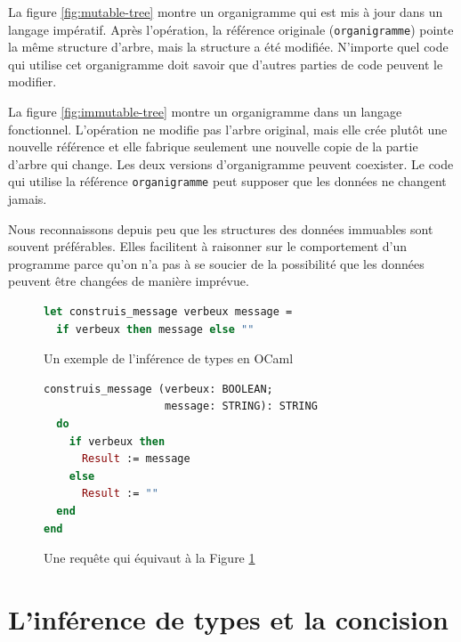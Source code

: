 \documentclass[french]{report}
\begin{document}
La figure \ref{fig:mutable-tree} montre un organigramme qui est mis à jour dans un langage impératif. Après l'opération, la référence originale (\texttt{organigramme}) pointe la même structure d'arbre, mais la structure a été modifiée. N'importe quel code qui utilise cet organigramme doit savoir que d'autres parties de code peuvent le modifier.

La figure \ref{fig:immutable-tree} montre un organigramme dans un langage fonctionnel. L'opération ne modifie pas l'arbre original, mais elle crée plutôt une nouvelle référence et elle fabrique seulement une nouvelle copie de la partie d'arbre qui change. Les deux versions d'organigramme peuvent coexister. Le code qui utilise la référence \texttt{organigramme} peut supposer que les données ne changent jamais.

Nous reconnaissons depuis peu que les structures des données immuables sont souvent préférables. Elles facilitent à raisonner sur le comportement d'un programme parce qu'on n'a pas à se soucier de la possibilité que les données peuvent être changées de manière imprévue.

\begin{figure}[h]
	\begin{lstlisting}[language=Caml]
let construis_message verbeux message = 
  if verbeux then message else ""
	\end{lstlisting}
	
	\caption{Un exemple de l'inférence de types en OCaml\protect\footnotemark}
	\label{fig:type-inference-code}
\end{figure}


\begin{figure}[h]
	\begin{lstlisting}[language=Eiffel]
construis_message (verbeux: BOOLEAN; 
                   message: STRING): STRING
  do
    if verbeux then
      Result := message
    else
      Result := ""
  end
end
	\end{lstlisting}
	\caption{Une requête qui équivaut à la Figure \ref{fig:type-inference-code}}
	\label{fig:without-type-inference-code}
\end{figure}

\section{L'inférence de types et la concision}
\end{document}
